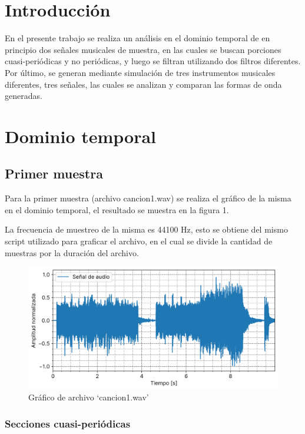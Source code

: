 \documentclass[12pt]{article}
\begin{document}
\section{Introducción}

En el presente trabajo se realiza un análisis en el dominio temporal de en
principio dos señales musicales de muestra, en las cuales se buscan porciones
cuasi-periódicas y no periódicas, y luego se filtran utilizando dos filtros
diferentes.  Por último, se generan mediante simulación de tres instrumentos
musicales diferentes, tres señales, las cuales se analizan y comparan las formas
de onda generadas.

\hypertarget{dominio-temporal}{%
\section{Dominio temporal}\label{dominio-temporal}}

\hypertarget{primer-muestra}{%
\subsection{Primer muestra}\label{primer-muestra}}

Para la primer muestra (archivo cancion1.wav) se realiza el
gráfico de la misma en el dominio temporal, el resultado se muestra en
la figura 1.

La frecuencia de muestreo de la misma es 44100 Hz, esto se obtiene del
mismo script utilizado para graficar el archivo, en el cual se divide la
cantidad de muestras por la duración del archivo.

\begin{figure}
\centering
\includegraphics{plot/cancion1.png}
\caption{Gráfico de archivo `cancion1.wav'}
\label{cancion1}
\end{figure}

\hypertarget{secciones-cuasi-periuxf3dicas}{%
\subsubsection{Secciones
cuasi-periódicas}\label{secciones-cuasi-periodicas}}
\end{document}
